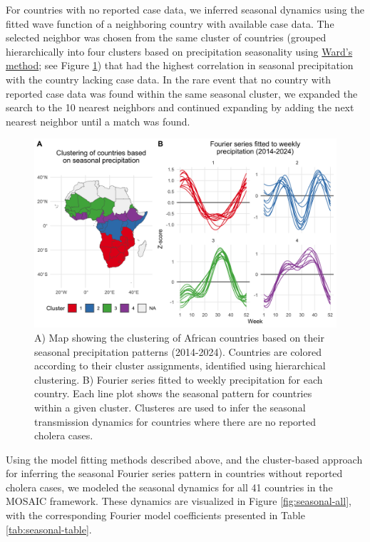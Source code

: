 \documentclass[
]{book}
\begin{document}
For countries with no reported case data, we inferred seasonal dynamics using the fitted wave function of a neighboring country with available case data. The selected neighbor was chosen from the same cluster of countries (grouped hierarchically into four clusters based on precipitation seasonality using \href{https://en.wikipedia.org/wiki/Ward\%27s_method}{Ward's method}; see Figure \ref{fig:seasonal-cluster}) that had the highest correlation in seasonal precipitation with the country lacking case data. In the rare event that no country with reported case data was found within the same seasonal cluster, we expanded the search to the 10 nearest neighbors and continued expanding by adding the next nearest neighbor until a match was found.

\begin{figure}

{\centering \includegraphics[width=1\linewidth]{figures/seasonal_precip_ward.D2_cluster} 

}

\caption{A) Map showing the clustering of African countries based on their seasonal precipitation patterns (2014-2024). Countries are colored according to their cluster assignments, identified using hierarchical clustering. B) Fourier series fitted to weekly precipitation for each country. Each line plot shows the seasonal pattern for countries within a given cluster. Clusteres are used to infer the seasonal transmission dynamics for countries where there are no reported cholera cases.}\label{fig:seasonal-cluster}
\end{figure}

Using the model fitting methods described above, and the cluster-based approach for inferring the seasonal Fourier series pattern in countries without reported cholera cases, we modeled the seasonal dynamics for all 41 countries in the MOSAIC framework. These dynamics are visualized in Figure \ref{fig:seasonal-all}, with the corresponding Fourier model coefficients presented in Table \ref{tab:seasonal-table}.
\end{document}

